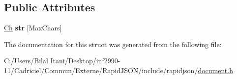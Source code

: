 \subsection*{Public Attributes}
\begin{DoxyCompactItemize}
\item 
\hyperlink{class_generic_value_ade0e0ce64ccd5d852da57a35e720bafb}{Ch} {\bfseries str} \mbox{[}Max\+Chars\mbox{]}\hypertarget{struct_generic_value_1_1_short_string_a444e24523d4cc33830d18a2cfcfd333b}{}\label{struct_generic_value_1_1_short_string_a444e24523d4cc33830d18a2cfcfd333b}

\end{DoxyCompactItemize}


The documentation for this struct was generated from the following file\+:\begin{DoxyCompactItemize}
\item 
C\+:/\+Users/\+Bilal Itani/\+Desktop/inf2990-\/11/\+Cadriciel/\+Commun/\+Externe/\+Rapid\+J\+S\+O\+N/include/rapidjson/\hyperlink{document_8h}{document.\+h}\end{DoxyCompactItemize}
